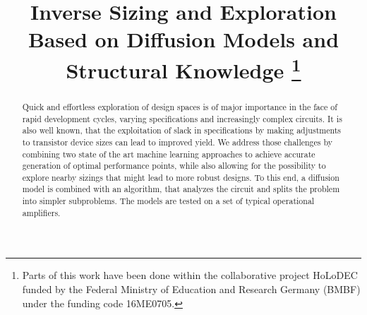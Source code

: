 \documentclass[conference]{IEEEtran}
\begin{document}

\title{Inverse Sizing and Exploration Based on Diffusion Models and Structural Knowledge
\thanks{Parts of this work have been done within the collaborative project HoLoDEC funded by the Federal Ministry of Education and Research Germany (BMBF) under the funding code 16ME0705.}}



\maketitle

\begin{abstract}
Quick and effortless exploration of design spaces is of major importance in the face of rapid development cycles, varying specifications and increasingly complex circuits.
It is also well known, that the exploitation of slack in specifications by making adjustments to transistor device sizes can lead to improved yield.
We address those challenges by combining two state of the art machine learning approaches to achieve accurate generation of optimal performance points, while also allowing for the possibility to explore nearby sizings that might lead to more robust designs. To this end, a diffusion model is combined with an algorithm, that analyzes the circuit and splits the problem into simpler subproblems. The models are tested on a set of typical operational amplifiers.
\end{abstract}

\end{document}
